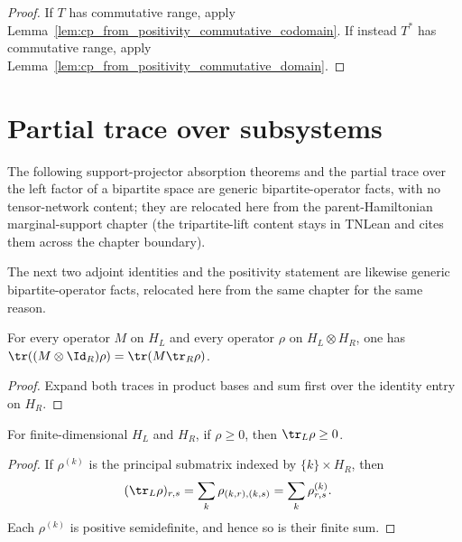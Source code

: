 \begin{proof}\leanok
    If $T$ has commutative range, apply
    Lemma~\ref{lem:cp_from_positivity_commutative_codomain}. If instead
    $T^*$ has commutative range, apply
    Lemma~\ref{lem:cp_from_positivity_commutative_domain}.
\end{proof}

\section{Partial trace over subsystems}

The following support-projector absorption theorems and the partial trace
over the left factor of a bipartite space are generic bipartite-operator
facts, with no tensor-network content; they are relocated here from the
parent-Hamiltonian marginal-support chapter (the tripartite-lift content
stays in TNLean and cites them across the chapter boundary).

The next two adjoint identities and the positivity statement are likewise
generic bipartite-operator facts, relocated here from the same chapter for
the same reason.

\begin{lemma}
    \label{lem:trace_lift_left_factor_mul}
    \leanok
    For every operator $M$ on $H_L$ and every operator $\rho$ on
    $H_L\otimes H_R$, one has
    $\tr((M\otimes\Id_R)\rho)=\tr(M\tr_R\rho)$.
\end{lemma}

\begin{proof}
    \leanok
    Expand both traces in product bases and sum first over the identity entry
    on $H_R$.
\end{proof}

\begin{theorem}
    \label{thm:partial_trace_left_pos}
    \leanok
    For finite-dimensional $H_L$ and $H_R$, if $\rho\geq 0$, then
    $\tr_L\rho\geq 0$.
\end{theorem}

\begin{proof}
    \leanok
    If $\rho^{(k)}$ is the principal submatrix indexed by
    $\{k\}\times H_R$, then
    \begin{align}
        (\tr_L\rho)_{r,s}
        &=\sum_k\rho_{(k,r),(k,s)} =\sum_k\rho^{(k)}_{r,s}.
        \notag
    \end{align}
    Each $\rho^{(k)}$ is positive semidefinite, and hence so is their finite
    sum.
\end{proof}

